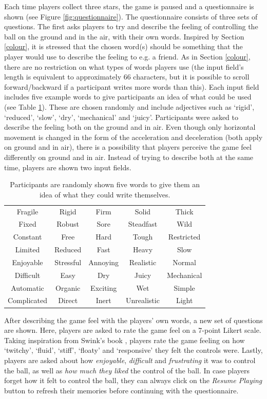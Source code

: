 Each time players collect three stars, the game is paused and a questionnaire is shown (see Figure \ref{fig:questionnaire}). The questionnaire consists of three sets of questions. The first asks players to try and describe the feeling of controlling the ball on the ground and in the air, with their own words. Inspired by Section \ref{colour}, it is stressed that the chosen word(s) should be something that the player would use to describe the feeling to e.g. a friend. As in Section \ref{colour}, there are no restriction on what types of words players use (the input field's length is equivalent to approximately 66 characters, but it is possible to scroll forward/backward if a participant writes more words than this). Each input field includes five example words to give participants an idea of what could be used (see Table \ref{table:wordsExamples}). These are chosen randomly and include adjectives such as `rigid', `reduced', `slow', `dry', `mechanical' and `juicy'. Participants were asked to describe the feeling both on the ground and in air. Even though only horizontal movement is changed in the form of the acceleration and deceleration (both apply on ground and in air), there is a possibility that players perceive the game feel differently on ground and in air. Instead of trying to describe both at the same time, players are shown two input fields.

\begin{table} \centering
\scriptsize
\caption{Participants are randomly shown five words to give them an idea of what they could write themselves.}
\label{table:wordsExamples}
\begin{tabular}{ccccc}
\toprule
Fragile & Rigid & Firm & Solid & Thick\\
Fixed & Robust & Sore & Steadfast & Wild\\
Constant & Free & Hard & Tough & Restricted\\
Limited & Reduced & Fast & Heavy & Slow\\
Enjoyable & Stressful & Annoying & Realistic & Normal\\
Difficult & Easy & Dry & Juicy & Mechanical\\
Automatic & Organic & Exciting & Wet & Simple\\
Complicated & Direct & Inert & Unrealistic & Light\\
\bottomrule
\end{tabular}
\end{table}

After describing the game feel with the players' own words, a new set of questions are shown. Here, players are asked to rate the game feel on a 7-point Likert scale. Taking inspiration from Swink's book \cite{swink}, players rate the game feeling on how `twitchy', `fluid', `stiff', `floaty' and `responsive' they felt the controls were. Lastly, players are asked about how \textit{enjoyable}, \textit{difficult} and \textit{frustrating} it was to control the ball, as well as \textit{how much they liked} the control of the ball. In case players forget how it felt to control the ball, they can always click on the \textit{Resume Playing} button to refresh their memories before continuing with the questionnaire.

